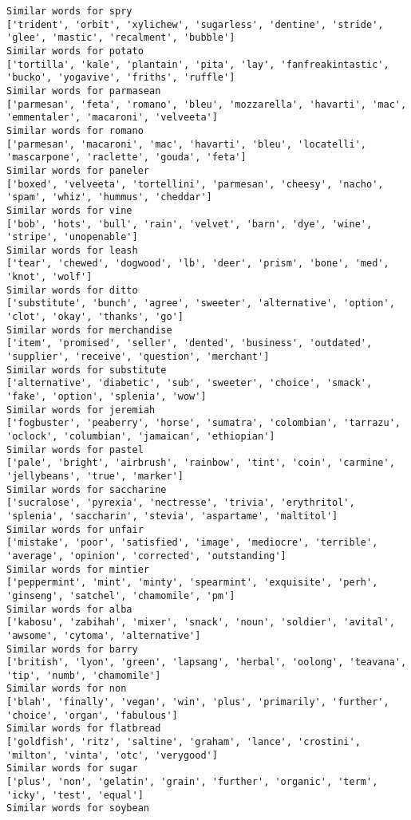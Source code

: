 \documentclass[11pt]{article}
\begin{document}
\begin{Verbatim}[commandchars=\\\{\}]
Similar words for spry
['trident', 'orbit', 'xylichew', 'sugarless', 'dentine', 'stride', 'glee', 'mastic', 'recalment', 'bubble']
Similar words for potato
['tortilla', 'kale', 'plantain', 'pita', 'lay', 'fanfreakintastic', 'bucko', 'yogavive', 'friths', 'ruffle']
Similar words for parmasean
['parmesan', 'feta', 'romano', 'bleu', 'mozzarella', 'havarti', 'mac', 'emmentaler', 'macaroni', 'velveeta']
Similar words for romano
['parmesan', 'macaroni', 'mac', 'havarti', 'bleu', 'locatelli', 'mascarpone', 'raclette', 'gouda', 'feta']
Similar words for paneler
['boxed', 'velveeta', 'tortellini', 'parmesan', 'cheesy', 'nacho', 'spam', 'whiz', 'hummus', 'cheddar']
Similar words for vine
['bob', 'hots', 'bull', 'rain', 'velvet', 'barn', 'dye', 'wine', 'stripe', 'unopenable']
Similar words for leash
['tear', 'chewed', 'dogwood', 'lb', 'deer', 'prism', 'bone', 'med', 'knot', 'wolf']
Similar words for ditto
['substitute', 'bunch', 'agree', 'sweeter', 'alternative', 'option', 'clot', 'okay', 'thanks', 'go']
Similar words for merchandise
['item', 'promised', 'seller', 'dented', 'business', 'outdated', 'supplier', 'receive', 'question', 'merchant']
Similar words for substitute
['alternative', 'diabetic', 'sub', 'sweeter', 'choice', 'smack', 'fake', 'option', 'splenia', 'wow']
Similar words for jeremiah
['fogbuster', 'peaberry', 'horse', 'sumatra', 'colombian', 'tarrazu', 'oclock', 'columbian', 'jamaican', 'ethiopian']
Similar words for pastel
['pale', 'bright', 'airbrush', 'rainbow', 'tint', 'coin', 'carmine', 'jellybeans', 'true', 'marker']
Similar words for saccharine
['sucralose', 'pyrexia', 'nectresse', 'trivia', 'erythritol', 'splenia', 'saccharin', 'stevia', 'aspartame', 'maltitol']
Similar words for unfair
['mistake', 'poor', 'satisfied', 'image', 'mediocre', 'terrible', 'average', 'opinion', 'corrected', 'outstanding']
Similar words for mintier
['peppermint', 'mint', 'minty', 'spearmint', 'exquisite', 'perh', 'ginseng', 'satchel', 'chamomile', 'pm']
Similar words for alba
['kabosu', 'zabihah', 'mixer', 'snack', 'noun', 'soldier', 'avital', 'awsome', 'cytoma', 'alternative']
Similar words for barry
['british', 'lyon', 'green', 'lapsang', 'herbal', 'oolong', 'teavana', 'tip', 'numb', 'chamomile']
Similar words for non
['blah', 'finally', 'vegan', 'win', 'plus', 'primarily', 'further', 'choice', 'organ', 'fabulous']
Similar words for flatbread
['goldfish', 'ritz', 'saltine', 'graham', 'lance', 'crostini', 'milton', 'vinta', 'otc', 'verygood']
Similar words for sugar
['plus', 'non', 'gelatin', 'grain', 'further', 'organic', 'term', 'icky', 'test', 'equal']
Similar words for soybean

\end{Verbatim}
\end{document}
